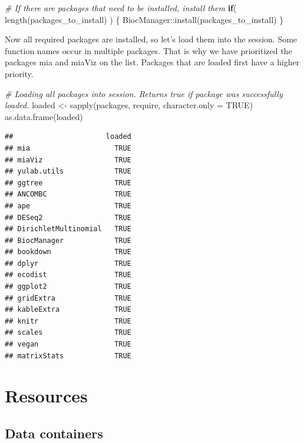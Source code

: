 \documentclass[
]{book}
\newenvironment{Shaded}{\begin{snugshade}}{\end{snugshade}}
\newcommand{\AttributeTok}[1]{\textcolor[rgb]{0.77,0.63,0.00}{#1}}
\newcommand{\CommentTok}[1]{\textcolor[rgb]{0.56,0.35,0.01}{\textit{#1}}}
\newcommand{\ConstantTok}[1]{\textcolor[rgb]{0.00,0.00,0.00}{#1}}
\newcommand{\ControlFlowTok}[1]{\textcolor[rgb]{0.13,0.29,0.53}{\textbf{#1}}}
\newcommand{\FunctionTok}[1]{\textcolor[rgb]{0.00,0.00,0.00}{#1}}
\newcommand{\NormalTok}[1]{#1}
\newcommand{\OtherTok}[1]{\textcolor[rgb]{0.56,0.35,0.01}{#1}}
\newcommand{\SpecialCharTok}[1]{\textcolor[rgb]{0.00,0.00,0.00}{#1}}
\begin{document}
\begin{Shaded}
\begin{Highlighting}[]
\CommentTok{\# If there are packages that need to be installed, install them }
\ControlFlowTok{if}\NormalTok{( }\FunctionTok{length}\NormalTok{(packages\_to\_install) ) \{}
\NormalTok{   BiocManager}\SpecialCharTok{::}\FunctionTok{install}\NormalTok{(packages\_to\_install)}
\NormalTok{\}}
\end{Highlighting}
\end{Shaded}

Now all required packages are installed, so let's load them into the
session. Some function names occur in multiple packages. That is why
we have prioritized the packages mia and miaViz on the list. Packages
that are loaded first have a higher priority.

\begin{Shaded}
\begin{Highlighting}[]
\CommentTok{\# Loading all packages into session. Returns true if package was successfully loaded.}
\NormalTok{loaded }\OtherTok{\textless{}{-}} \FunctionTok{sapply}\NormalTok{(packages, require, }\AttributeTok{character.only =} \ConstantTok{TRUE}\NormalTok{)}
\FunctionTok{as.data.frame}\NormalTok{(loaded)}
\end{Highlighting}
\end{Shaded}

\begin{verbatim}
##                      loaded
## mia                    TRUE
## miaViz                 TRUE
## yulab.utils            TRUE
## ggtree                 TRUE
## ANCOMBC                TRUE
## ape                    TRUE
## DESeq2                 TRUE
## DirichletMultinomial   TRUE
## BiocManager            TRUE
## bookdown               TRUE
## dplyr                  TRUE
## ecodist                TRUE
## ggplot2                TRUE
## gridExtra              TRUE
## kableExtra             TRUE
## knitr                  TRUE
## scales                 TRUE
## vegan                  TRUE
## matrixStats            TRUE
\end{verbatim}

\hypertarget{resources}{%
\chapter{Resources}\label{resources}}

\hypertarget{data-containers-1}{%
\section{Data containers}\label{data-containers-1}}
\end{document}
